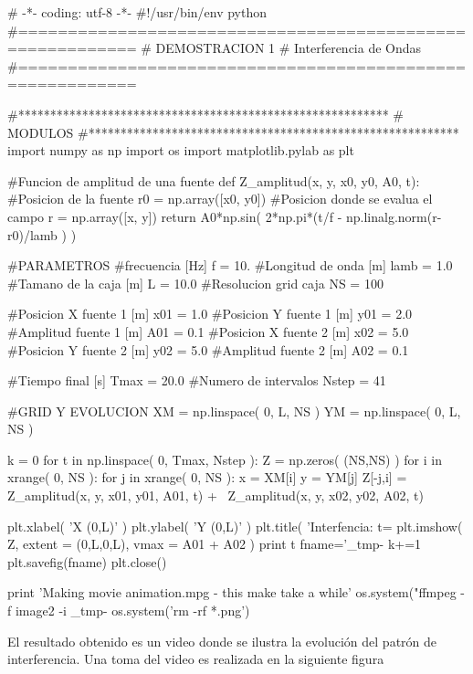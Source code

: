 \begin{listing}[style=python]
# -*- coding: utf-8 -*-
#!/usr/bin/env python
#==========================================================
# DEMOSTRACION 1
# Interferencia de Ondas
#==========================================================

#**********************************************************
#	MODULOS
#**********************************************************
import numpy as np
import os
import matplotlib.pylab as plt

#Funcion de amplitud de una fuente
def Z_amplitud(x, y, x0, y0, A0, t):
    #Posicion de la fuente
    r0 = np.array([x0, y0])
    #Posicion donde se evalua el campo
    r = np.array([x, y])
    return A0*np.sin( 2*np.pi*(t/f - np.linalg.norm(r-r0)/lamb ) )

#PARAMETROS
#frecuencia		[Hz]
f = 10.
#Longitud de onda	[m]
lamb = 1.0
#Tamano de la caja	[m]
L = 10.0
#Resolucion grid caja
NS = 100

#Posicion X fuente 1	[m]
x01 = 1.0	
#Posicion Y fuente 1	[m]
y01 = 2.0
#Amplitud fuente 1	[m]
A01 = 0.1
#Posicion X fuente 2	[m]
x02 = 5.0	
#Posicion Y fuente 2	[m]
y02 = 5.0
#Amplitud fuente 2	[m]
A02 = 0.1

#Tiempo final		[s]
Tmax = 20.0
#Numero de intervalos
Nstep = 41

#GRID Y EVOLUCION
XM = np.linspace( 0, L, NS )
YM = np.linspace( 0, L, NS )

k = 0
for t in np.linspace( 0, Tmax, Nstep ):
    Z = np.zeros( (NS,NS) )
    for i in xrange( 0, NS ):
	for j in xrange( 0, NS ):
	    x = XM[i]
	    y = YM[j]
	    Z[-j,i] = Z_amplitud(x, y, x01, y01, A01, t) + \
	    Z_amplitud(x, y, x02, y02, A02, t)
	    
    plt.xlabel( 'X (0,L)' )
    plt.ylabel( 'Y (0,L)' )
    plt.title( 'Interfencia: t=%
    plt.imshow( Z, extent = (0,L,0,L), vmax = A01 + A02 )
    print t
    fname='_tmp-%
    k+=1
    plt.savefig(fname)
    plt.close()

print 'Making movie animation.mpg - this make take a while'
os.system("ffmpeg -f image2 -i _tmp-%
os.system('rm -rf *.png')
\end{listing}

El resultado obtenido es un video donde se ilustra la evolución del patrón
de interferencia. Una toma del video es realizada en la siguiente figura


